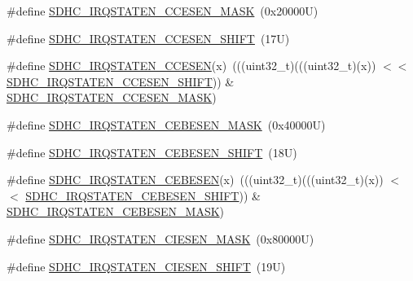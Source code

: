 \begin{DoxyCompactItemize}
\item 
\#define \mbox{\hyperlink{group___s_d_h_c___register___masks_gab4c7b840945f9d7fbc1912e6b210ab77}{S\+D\+H\+C\+\_\+\+I\+R\+Q\+S\+T\+A\+T\+E\+N\+\_\+\+C\+C\+E\+S\+E\+N\+\_\+\+M\+A\+SK}}~(0x20000\+U)
\item 
\#define \mbox{\hyperlink{group___s_d_h_c___register___masks_ga373ff5b200a397f6c4a71a9e831ee6c8}{S\+D\+H\+C\+\_\+\+I\+R\+Q\+S\+T\+A\+T\+E\+N\+\_\+\+C\+C\+E\+S\+E\+N\+\_\+\+S\+H\+I\+FT}}~(17\+U)
\item 
\#define \mbox{\hyperlink{group___s_d_h_c___register___masks_ga5e2e9c41af8e9994d9119c333f0ca924}{S\+D\+H\+C\+\_\+\+I\+R\+Q\+S\+T\+A\+T\+E\+N\+\_\+\+C\+C\+E\+S\+EN}}(x)~(((uint32\+\_\+t)(((uint32\+\_\+t)(x)) $<$$<$ \mbox{\hyperlink{group___s_d_h_c___register___masks_ga373ff5b200a397f6c4a71a9e831ee6c8}{S\+D\+H\+C\+\_\+\+I\+R\+Q\+S\+T\+A\+T\+E\+N\+\_\+\+C\+C\+E\+S\+E\+N\+\_\+\+S\+H\+I\+FT}})) \& \mbox{\hyperlink{group___s_d_h_c___register___masks_gab4c7b840945f9d7fbc1912e6b210ab77}{S\+D\+H\+C\+\_\+\+I\+R\+Q\+S\+T\+A\+T\+E\+N\+\_\+\+C\+C\+E\+S\+E\+N\+\_\+\+M\+A\+SK}})
\item 
\#define \mbox{\hyperlink{group___s_d_h_c___register___masks_gadb32296ea39bd0cd1cd2d5719365c49a}{S\+D\+H\+C\+\_\+\+I\+R\+Q\+S\+T\+A\+T\+E\+N\+\_\+\+C\+E\+B\+E\+S\+E\+N\+\_\+\+M\+A\+SK}}~(0x40000\+U)
\item 
\#define \mbox{\hyperlink{group___s_d_h_c___register___masks_ga72fbf9bf13c5e322d4671010c7719927}{S\+D\+H\+C\+\_\+\+I\+R\+Q\+S\+T\+A\+T\+E\+N\+\_\+\+C\+E\+B\+E\+S\+E\+N\+\_\+\+S\+H\+I\+FT}}~(18\+U)
\item 
\#define \mbox{\hyperlink{group___s_d_h_c___register___masks_ga3cb3369cc6fe721055f7cc98138801a6}{S\+D\+H\+C\+\_\+\+I\+R\+Q\+S\+T\+A\+T\+E\+N\+\_\+\+C\+E\+B\+E\+S\+EN}}(x)~(((uint32\+\_\+t)(((uint32\+\_\+t)(x)) $<$$<$ \mbox{\hyperlink{group___s_d_h_c___register___masks_ga72fbf9bf13c5e322d4671010c7719927}{S\+D\+H\+C\+\_\+\+I\+R\+Q\+S\+T\+A\+T\+E\+N\+\_\+\+C\+E\+B\+E\+S\+E\+N\+\_\+\+S\+H\+I\+FT}})) \& \mbox{\hyperlink{group___s_d_h_c___register___masks_gadb32296ea39bd0cd1cd2d5719365c49a}{S\+D\+H\+C\+\_\+\+I\+R\+Q\+S\+T\+A\+T\+E\+N\+\_\+\+C\+E\+B\+E\+S\+E\+N\+\_\+\+M\+A\+SK}})
\item 
\#define \mbox{\hyperlink{group___s_d_h_c___register___masks_gaa59f05865a6f6434fd4fcf216a4d522a}{S\+D\+H\+C\+\_\+\+I\+R\+Q\+S\+T\+A\+T\+E\+N\+\_\+\+C\+I\+E\+S\+E\+N\+\_\+\+M\+A\+SK}}~(0x80000\+U)
\item 
\#define \mbox{\hyperlink{group___s_d_h_c___register___masks_ga5db5c25cea330a48bbd4e8439f6eca8d}{S\+D\+H\+C\+\_\+\+I\+R\+Q\+S\+T\+A\+T\+E\+N\+\_\+\+C\+I\+E\+S\+E\+N\+\_\+\+S\+H\+I\+FT}}~(19\+U)

\end{DoxyCompactItemize}

